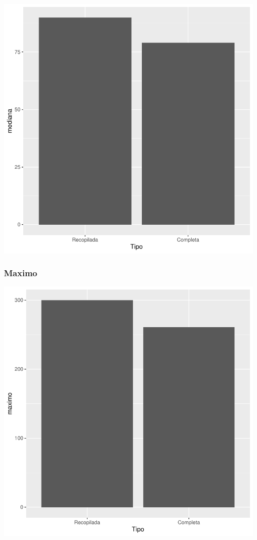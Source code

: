 \documentclass{article}
\begin{document}
\includegraphics{seguimento2-047}

\subsubsection{Maximo}

\includegraphics{seguimento2-048}
\end{document}

